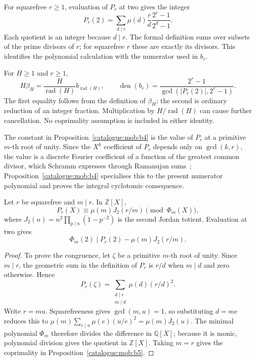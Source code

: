 \begin{prop}\label{catalogue:mob:b2}
For squarefree $r\ge1$, evaluation of $P_r$ at two gives the integer
\[
 P_r(2)=\sum_{d\mid r}\mu(d)\frac rd
                         \frac{2^r-1}{2^d-1}.
\]
Each quotient is an integer because $d\mid r$. The formal definition
sums over subsets of the prime divisors of $r$; for squarefree $r$
these are exactly its divisors. This identifies the polynomial
calculation with the numerator used in $b_r$.
\end{prop}

\begin{prop}\label{catalogue:mob:b3}
For $H\ge1$ and $r\ge1$,
\[
 H\beta_H=\frac H{\operatorname{rad}(H)}b_{\operatorname{rad}(H)},
 \qquad
 \operatorname{den}(b_r)
   =\frac{2^r-1}{\gcd(|P_r(2)|,2^r-1)}.
\]
The first equality follows from the definition of $\beta_H$; the
second is ordinary reduction of an integer fraction. Multiplication
by $H/\operatorname{rad}(H)$ can cause further cancellation. No
coprimality assumption is included in either identity.
\end{prop}

\noindent The constant in Proposition~\ref{catalogue:mob:b4} is the value of $P_r$ at a primitive
$m$-th root of unity. Since the $X^k$ coefficient of $P_r$ depends only on
$\gcd(k,r)$, the value is a discrete Fourier coefficient of a function of the
greatest common divisor, which Schramm expresses through Ramanujan
sums~\cite[Theorem and (2), p.~2]{schramm-gcd}; Proposition~\ref{catalogue:mob:b4} specialises this to the
present numerator polynomial and proves the integral cyclotomic consequence.

\begin{prop}\label{catalogue:mob:b4}
Let $r$ be squarefree and $m\mid r$. In $\mathbb Z[X]$,
\[
 P_r(X)\equiv\mu(m)J_2(r/m)\pmod{\Phi_m(X)},
\]
where $J_2(n)=n^2\prod_{p\mid n}(1-p^{-2})$ is the second Jordan
totient. Evaluation at two gives
\[
 \Phi_m(2)\mid P_r(2)-\mu(m)J_2(r/m).
\]
\end{prop}

\begin{proof}
To prove the congruence, let $\zeta$ be a primitive $m$-th root of
unity. Since $m\mid r$, the geometric sum in the definition of $P_r$
is $r/d$ when $m\mid d$ and zero otherwise. Hence
\[
 P_r(\zeta)=\sum_{\substack{d\mid r\\m\mid d}}\mu(d)(r/d)^2.
\]
Write $r=mu$. Squarefreeness gives $\gcd(m,u)=1$, so substituting
$d=me$ reduces this to
$\mu(m)\sum_{e\mid u}\mu(e)(u/e)^2=\mu(m)J_2(u)$.
The minimal polynomial $\Phi_m$ therefore divides the difference in
$\mathbb Q[X]$; because it is monic, polynomial division gives the
quotient in $\mathbb Z[X]$. Taking $m=r$ gives the coprimality in
Proposition~\ref{catalogue:mob:b5}.
\end{proof}

